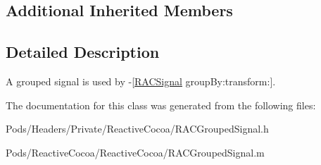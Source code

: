 \subsection*{Additional Inherited Members}


\subsection{Detailed Description}
A grouped signal is used by -\/\mbox{[}\mbox{\hyperlink{interface_r_a_c_signal}{R\+A\+C\+Signal}} group\+By\+:transform\+:\mbox{]}. 

The documentation for this class was generated from the following files\+:\begin{DoxyCompactItemize}
\item 
Pods/\+Headers/\+Private/\+Reactive\+Cocoa/R\+A\+C\+Grouped\+Signal.\+h\item 
Pods/\+Reactive\+Cocoa/\+Reactive\+Cocoa/R\+A\+C\+Grouped\+Signal.\+m\end{DoxyCompactItemize}
